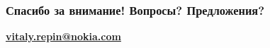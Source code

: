 \documentclass[compress,hyperref={linkcolor=blue,pdftex,unicode}]{beamer}
\newcommand{\myhref}[2]{\textcolor{blue}{\href{#1}{#2}}}
\begin{document}
\begin{frame}
\frametitle{Спасибо за внимание! Вопросы? Предложения?}
\centerline{}

\begin{center}
\huge\bf \myhref{mailto:vitaly.repin@nokia.com}{vitaly.repin@nokia.com}
\end{center}
\end{frame}
\end{document}
